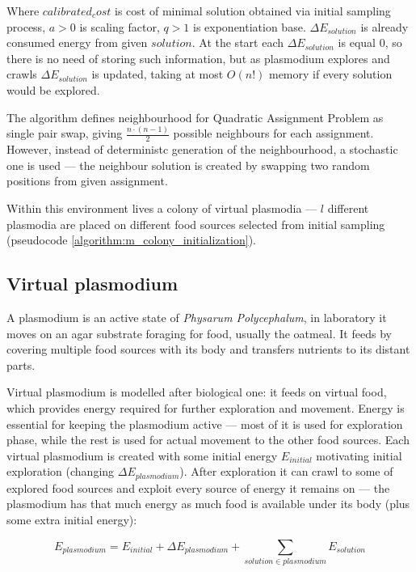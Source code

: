 Where $calibrated_cost$ is cost of minimal solution obtained via initial sampling process, $a > 0$ is scaling factor, $q > 1$ is exponentiation base. ${\Delta}E_{solution}$ is already consumed energy from given $solution$. At the start each ${\Delta}E_{solution}$ is equal $0$, so there is no need of storing such information, but as plasmodium explores and crawls ${\Delta}E_{solution}$ is updated, taking at most $O(n!)$ memory if every solution would be explored.

The algorithm defines neighbourhood for Quadratic Assignment Problem as single pair swap, giving $\frac{n\cdot(n-1)}{2}$ possible neighbours for each assignment. However, instead of deterministc generation of the neighbourhood, a stochastic one is used --- the neighbour solution is created by swapping two random positions from given assignment.

Within this environment lives a colony of virtual plasmodia --- $l$ different plasmodia are placed on different food sources selected from initial sampling (pseudocode \ref{algorithm:m_colony_initialization}). 

\subsection{Virtual plasmodium}

A plasmodium is an active state of \textit{Physarum Polycephalum}, in laboratory it moves on an agar substrate foraging for food, usually the oatmeal. It feeds by covering multiple food sources with its body and transfers nutrients to its distant parts.

Virtual plasmodium is modelled after biological one: it feeds on virtual food, which provides energy required for further exploration and movement. Energy is essential for keeping the plasmodium active --- most of it is used for exploration phase, while the rest is used for actual movement to the other food sources. Each virtual plasmodium is created with some initial energy $E_{initial}$ motivating initial exploration (changing ${\Delta}E_{plasmodium}$). After exploration it can crawl to some of explored food sources and exploit every source of energy it remains on --- the plasmodium has that much energy as much food is available under its body (plus some extra initial energy):

\begin{equation}
  E_{plasmodium} = E_{initial} + {\Delta}E_{plasmodium} + \sum\limits_{solution \in plasmodium} E_{solution}
\end{equation}

